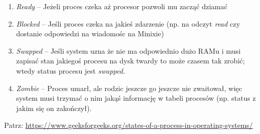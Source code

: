 \begin{enumerate}
    \item \textit{Ready} -- Jeżeli proces czeka aż procesor pozwoli mu zacząć dziamać 
    \item \textit{Blocked} -- Jeśli proces czeka na jakieś zdarzenie (np. na odczyt \textit{read} czy dostanie odpowiedzi na wiadomośc na Minixie)
    \item \textit{Swapped} -- Jeśli system uzna że nie ma odpowiednio dużo RAMu i musi zapisać stan jakiegoś procesu na dysk twardy to może czasem tak zrobić; wtedy status procesu jest \textit{swapped}.
    \item \textit{Zombie} -- Proces umarł, ale rodzic jeszcze go jeszcze nie zwaitował, więc system musi trzymać o nim jakąś informację w tabeli procesów (np. status z jakim się on zakończył).
\end{enumerate}

Patrz: \url{https://www.geeksforgeeks.org/states-of-a-process-in-operating-systems/}

